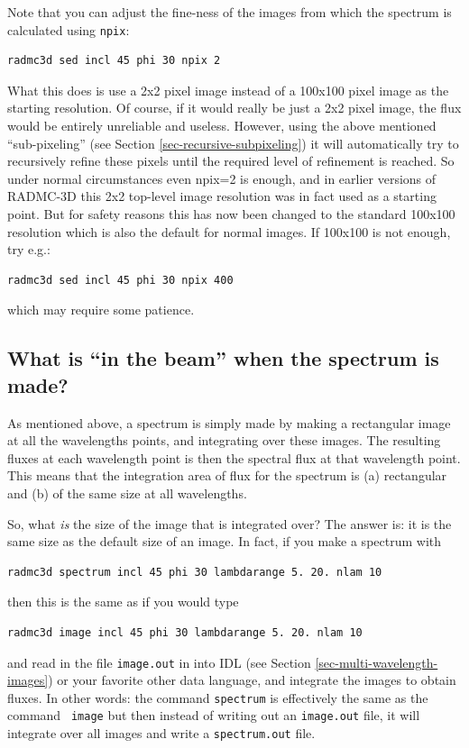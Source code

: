 \documentclass{report}
\newenvironment{asciibox}%
  {\begin{list}{}{%
    \setlength{\topsep}{0.5em}%
    \setlength{\parskip}{0em}%
    \setlength{\parsep}{0em}%
    \setlength{\itemsep}{0em}%
    \setlength{\rightmargin}{0em}%
    \setlength{\leftmargin}{3.0em}%
    \setlength{\labelsep}{1em}%
    \setlength{\labelwidth}{2em}%
  }\normalfont\footnotesize\item}
  {\end{list}}
\begin{document}
Note that you can adjust the fine-ness of the images from which the
spectrum is calculated using {\small\tt npix}:
\begin{asciibox}\begin{verbatim}
radmc3d sed incl 45 phi 30 npix 2
\end{verbatim}\end{asciibox}
What this does is use a 2x2 pixel image instead of a 100x100 pixel image as
the starting resolution. Of course, if it would really be just a 2x2 pixel
image, the flux would be entirely unreliable and useless. However, using the
above mentioned ``sub-pixeling'' (see Section
\ref{sec-recursive-subpixeling}) it will automatically try to recursively
refine these pixels until the required level of refinement is reached. So
under normal circumstances even npix=2 is enough, and in earlier versions of
RADMC-3D this 2x2 top-level image resolution was in fact used as a starting
point. But for safety reasons this has now been changed to the standard
100x100 resolution which is also the default for normal images. If 100x100
is not enough, try e.g.:
\begin{asciibox}\begin{verbatim}
radmc3d sed incl 45 phi 30 npix 400
\end{verbatim}\end{asciibox}
which may require some patience.


\subsection{What is ``in the beam'' when the spectrum is made?}
As mentioned above, a spectrum is simply made by making a rectangular image
at all the wavelengths points, and integrating over these images. The
resulting fluxes at each wavelength point is then the spectral flux at that
wavelength point. This means that the integration area of flux for the
spectrum is (a) rectangular and (b) of the same size at all wavelengths.

So, what {\em is} the size of the image that is integrated over? The answer
is: it is the same size as the default size of an image. In fact, if you
make a spectrum with
\begin{asciibox}\begin{verbatim}
radmc3d spectrum incl 45 phi 30 lambdarange 5. 20. nlam 10
\end{verbatim}\end{asciibox}
then this is the same as if you would type
\begin{asciibox}\begin{verbatim}
radmc3d image incl 45 phi 30 lambdarange 5. 20. nlam 10
\end{verbatim}\end{asciibox}
and read in the file {\small\tt image.out} in into IDL (see Section
\ref{sec-multi-wavelength-images}) or your favorite other data language, and
integrate the images to obtain fluxes. In other words: the command
{\small\tt spectrum} is effectively the same as the command {\small\tt
image} but then instead of writing out an {\small\tt image.out} file, it
will integrate over all images and write a {\small\tt spectrum.out} file.
\end{document}
